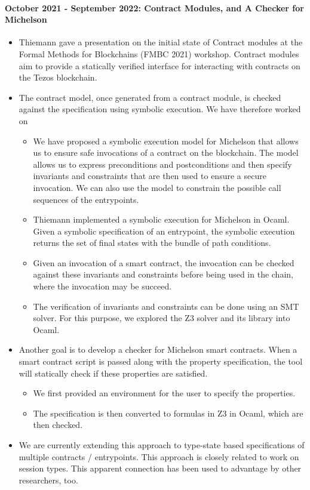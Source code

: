 \documentclass[a4paper,11pt]{article}
\begin{document}
\paragraph{October 2021 - September 2022: Contract Modules, and A Checker for Michelson}
\begin{itemize}
\item Thiemann gave a presentation on the initial state of Contract modules at the Formal Methods for Blockchains (FMBC 2021) workshop. Contract modules aim to provide a statically verified interface for interacting with contracts on the Tezos blockchain.
\item The contract model, once generated from a contract module, is checked against the specification using symbolic execution. We have therefore worked on

\begin{itemize}
\item We have proposed a symbolic execution model for Michelson that allows us to ensure safe invocations of a contract on the blockchain. The model allows us to express preconditions and postconditions and then specify invariants and constraints that are then used to ensure a secure invocation. We can also use the model to constrain the possible call sequences of the entrypoints.
\item Thiemann implemented a symbolic execution for Michelson in Ocaml. Given a symbolic specification of an entrypoint, the symbolic execution returns the set of final states with the bundle of path conditions. 
\item Given an invocation of a smart contract, the invocation can be checked against these invariants and constraints before being used in the chain, where the invocation may be succeed. 
\item The verification of invariants and constraints can be done using an SMT solver. For this purpose, we explored the Z3 solver and its library into Ocaml.
\end{itemize}

\item Another goal is to develop a checker for Michelson smart contracts. When a smart contract script is passed along with the property specification, the tool will statically check if these properties are satisfied. 
\begin{itemize}
\item We first provided an environment for the user to specify the properties. 
\item The specification is then converted to formulas in Z3 in Ocaml, which are then checked.  
\end{itemize}
\item We are currently extending this approach to type-state based specifications of multiple contracts / entrypoints. This approach is closely related to work on session types. This apparent connection has been used to advantage by other researchers, too.
\end{itemize}
\end{document}
